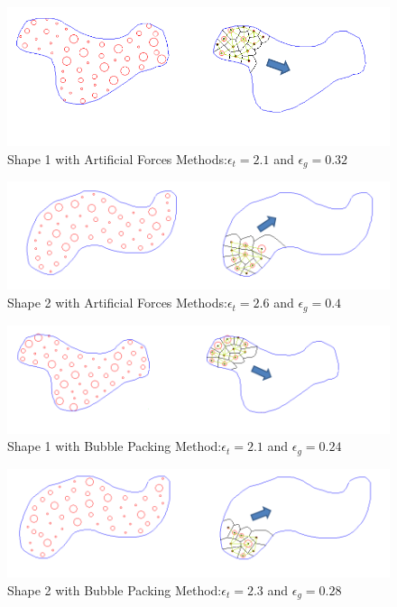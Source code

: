 \begin{figure}[H]
\caption{Shape 1 with Artificial Forces Methods:$\epsilon_t = 2.1$ and $\epsilon_g = 0.32$}
\centerline{\includegraphics[scale = 0.70]{Artificial_Forces_Mesh_1}}
\end{figure} 		
		
\begin{figure}[H]
\caption{Shape 2 with Artificial Forces Methods:$\epsilon_t = 2.6$ and $\epsilon_g = 0.4$}
\centerline{\includegraphics[scale = 0.65]{Artificial_Forces_Mesh_2}}
\end{figure} 		
		
\begin{figure}[H]
\caption{Shape 1 with Bubble Packing Method:$\epsilon_t = 2.1$ and $\epsilon_g = 0.24$}
\centerline{\includegraphics[scale = 0.70]{Bubble_Packing_Mesh_1}}
\end{figure} 	
				
\begin{figure}[H]
\caption{Shape 2 with Bubble Packing Method:$\epsilon_t = 2.3$ and $\epsilon_g = 0.28$}
\centerline{\includegraphics[scale = 0.65]{Bubble_Packing_Mesh_2}}
\end{figure} 			
						
